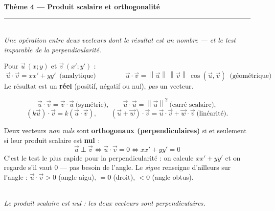 \documentclass[11pt,a4paper]{article}
\providecommand{\norm}[1]{\left\lVert #1\right\rVert}
\begin{document}
\begin{center}
{\LARGE\bfseries\color{primarydark}Thème 4 — Produit scalaire et orthogonalité}\\[2pt]
{\color{primary}\rule{0.66\linewidth}{1.2pt}}\\[4pt]
{\small\itshape Une opération entre deux vecteurs dont le résultat est un \emph{nombre} — et le test
imparable de la perpendicularité.}
\end{center}
\vspace{1mm}

\begin{rappel}
Pour $\vec u\,(x;y)$ et $\vec v\,(x';y')$ :
\[
  \boxed{\;\vec u\cdot\vec v=x x'+y y'\;}\ \text{(analytique)}
  \qquad\qquad
  \boxed{\;\vec u\cdot\vec v=\norm{\vec u}\,\norm{\vec v}\,\cos(\vec u,\vec v)\;}\ \text{(géométrique)}
\]
Le résultat est un \textbf{réel} (positif, négatif ou nul), \emph{pas} un vecteur.
\end{rappel}

\begin{rappel}
\[
  \vec u\cdot\vec v=\vec v\cdot\vec u\ \text{(symétrie)},\qquad
  \vec u\cdot\vec u=\norm{\vec u}^2\ \text{(carré scalaire)},
\]
\[
  (k\vec u)\cdot\vec v=k(\vec u\cdot\vec v),\qquad
  (\vec u+\vec w)\cdot\vec v=\vec u\cdot\vec v+\vec w\cdot\vec v\ \text{(linéarité)}.
\]
\end{rappel}

\begin{idee}
Deux vecteurs \emph{non nuls} sont \textbf{orthogonaux (perpendiculaires)} si et seulement si leur
produit scalaire est \textbf{nul} :
\[
  \boxed{\;\vec u\perp\vec v \iff \vec u\cdot\vec v=0 \iff x x'+y y'=0\;}
\]
C'est le test le plus rapide pour la perpendicularité : on calcule $xx'+yy'$ et on regarde s'il vaut
$0$ — pas besoin de l'angle. Le \emph{signe} renseigne d'ailleurs sur l'angle :
$\vec u\cdot\vec v>0$ (angle aigu), $=0$ (droit), $<0$ (angle obtus).
\end{idee}

\begin{center}
\\[1pt]
{\footnotesize\itshape Le produit scalaire est nul : les deux vecteurs sont perpendiculaires.}
\end{center}
\end{document}
